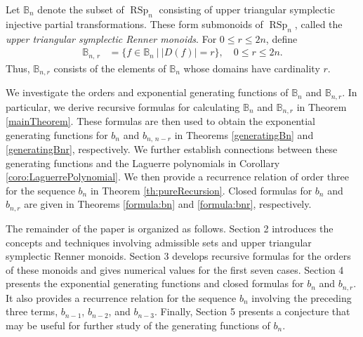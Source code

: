 \documentclass[11pt]{article}
\newcommand{\q}{\quad}
\newcommand{\les}{\leqslant}
\DeclareMathOperator{\RSp}{RSp}
\begin{document}
Let $\mathbb B_n$ denote the subset of $\RSp_n$ consisting of upper triangular symplectic injective partial transformations. These form submonoids of $\RSp_n$, called the {\em upper triangular symplectic Renner monoids}. For $0\leq r\leq2n$, define
\begin{align*}
\mathbb B_{n,\,r}&=\{ f\in \mathbb B_n ~\big|~|D(f)|=r\},\q 0\les r\les 2n.
\end{align*}
Thus, $\mathbb B_{n,r}$ consists of the elements of $\mathbb B_n$ whose domains have cardinality $r$.

We investigate the orders and exponential generating functions of $\mathbb B_n$ and $\mathbb B_{n,r}$. In particular, we derive recursive formulas for calculating $\mathbb B_n$ and $\mathbb B_{n,r}$ in Theorem \ref{mainTheorem}. These formulas are then used to obtain the exponential generating functions for $b_n$ and $b_{n,\,n-r}$ in Theorems \ref{generatingBn} and \ref{generatingBnr}, respectively. We further establish connections between these generating functions and the Laguerre polynomials in Corollary \ref{coro:LaguerrePolynomial}. We then provide a recurrence relation of order three for the sequence $b_n$ in Theorem \ref{th:pureRecursion}. Closed formulas for $b_n$ and $b_{n,r}$ are given in Theorems \ref{formula:bn} and \ref{formula:bnr}, respectively.

The remainder of the paper is organized as follows. Section 2 introduces the concepts and techniques involving admissible sets and upper triangular symplectic Renner monoids. Section 3 develops recursive formulas for the orders of these monoids and gives numerical values for the first seven cases. Section 4 presents the exponential generating functions and closed formulas for $b_n$ and $b_{n,r}$. It also provides a recurrence relation for the sequence $b_n$ involving the preceding three terms, $b_{n-1}$, $b_{n-2}$, and $b_{n-3}$. Finally, Section 5 presents a conjecture that may be useful for further study of the generating functions of $b_n$.
\end{document}

